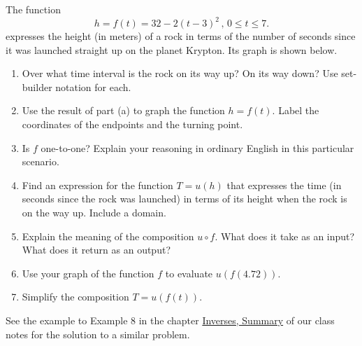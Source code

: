 \documentclass{ximera}
\begin{document}
\begin{question} \label{Qpve03}
The function
\[
  h = f(t) = 32 - 2(t-3)^2 \, , \, 0\leq t \leq 7.
\]
expresses the height (in meters) of a rock in terms of the number of seconds since it was launched straight up on the planet Krypton. Its graph is shown below.

 


\begin{enumerate}
\item Over what time interval is the rock on its way up? On its way down? Use set-builder notation for each.

\item Use the result of part (a) to graph the function $h=f(t)$. Label the coordinates of the endpoints and the turning point.

\item Is $f$ one-to-one? Explain your reasoning in ordinary English in this particular scenario.

\item Find an expression for the function $T=u(h)$ that expresses the time (in seconds since the rock was launched) in terms of its height when the rock is on the way up. Include a domain.

\item Explain the meaning of the composition $u\circ f$. What does it take as an input? What does it return as an output?

\item Use your graph of the function $f$ to evaluate $u(f(4.72))$.

\item Simplify the composition $T =u(f(t))$.

\end{enumerate}

\begin{explanation}
See the example to Example 8 in the chapter \href{https://ximera.osu.edu/precalc1/PreCalculus1/InversesSummary/InversesSummary}{Inverses, Summary} of our class notes for the solution to a similar problem.
\end{explanation}
\end{question}
\end{document}
